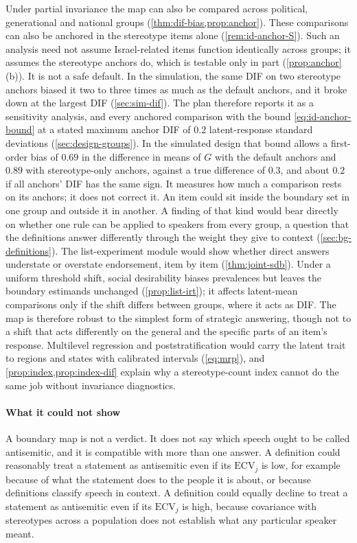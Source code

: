 Under partial invariance the map can also be compared across
political, generational and national groups (\cref{thm:dif-bias,prop:anchor}).
These comparisons can also be anchored in the stereotype items alone
(\cref{rem:id-anchor-S}). Such an analysis need not assume Israel-related
items function identically across groups; it assumes the stereotype anchors
do, which is testable only in part (\cref{prop:anchor}(b)). It is not a
safe default. In the simulation, the same DIF on two stereotype anchors
biased it two to three times as much as the default anchors, and it broke
down at the largest DIF (\cref{sec:sim-dif}). The plan therefore reports it
as a sensitivity analysis, and every anchored comparison with the bound
\eqref{eq:id-anchor-bound} at a stated maximum anchor DIF of $0.2$
latent-response standard deviations (\cref{sec:design-groups}). In the
simulated design that bound allows a first-order bias of $0.69$ in the
difference in means of $G$ with the default anchors and $0.89$ with
stereotype-only anchors, against a true difference of $0.3$, and about $0.2$
if all anchors' DIF has the same sign. It measures how much a comparison
rests on its anchors; it does not correct it.
An item could sit inside the boundary set in one group and outside it in
another. A finding of that kind would bear directly on whether one rule can
be applied to speakers from every group, a question that the definitions
answer differently through the weight they give to context
(\cref{sec:bg-definitions}). The list-experiment module would show whether
direct answers understate or overstate endorsement, item by item
(\cref{thm:joint-sdb}). Under a uniform threshold shift, social desirability
biases prevalences but leaves the boundary estimands unchanged
(\cref{prop:list-irt}); it affects latent-mean comparisons only if the shift
differs between groups, where it acts as DIF. The map is therefore robust to
the simplest form of strategic answering, though not to a shift that acts
differently on the general and the specific parts of an item's response. Multilevel regression and
poststratification would carry the latent trait to regions and states with
calibrated intervals (\cref{eq:mrp}), and \cref{prop:index,prop:index-dif} explain why a
stereotype-count index cannot do the same job without invariance
diagnostics.

\paragraph{What it could not show}
A boundary map is not a verdict. It does not say which speech ought to be
called antisemitic, and it is compatible with more than one answer. A
definition could reasonably treat a statement as antisemitic even if its
$\mathrm{ECV}_j$ is low, for example because of what the statement does to
the people it is about, or because definitions classify speech in context.
A definition could equally decline to treat a statement as antisemitic even
if its $\mathrm{ECV}_j$ is high, because covariance with stereotypes across
a population does not establish what any particular speaker meant.

